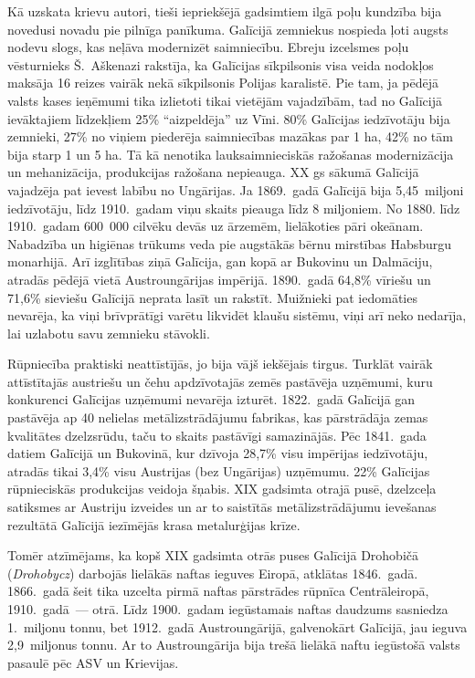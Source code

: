 \documentclass[twoside,a5paper,12pt,fleqn,openany]{extbook}
\newcommand{\pltxti}[1]{\textit{\textpolish{#1}}}
\begin{document}
Kā uzskata krievu autori, tieši iepriekšējā gadsimtiem ilgā poļu kundzība bija novedusi novadu pie pilnīga panīkuma. Galīcijā zemniekus nospieda ļoti augsts nodevu slogs, kas neļāva modernizēt saimniecību. Ebreju izcelsmes poļu vēsturnieks Š.~Aškenazi rakstīja, ka Galīcijas sīkpilsonis visa veida nodokļos maksāja 16 reizes vairāk nekā sīkpilsonis Polijas karalistē. Pie tam, ja pēdējā valsts kases ieņēmumi tika izlietoti tikai vietējām vajadzībām, tad no Galīcijā ievāktajiem līdzekļiem 25\% ``aizpeldēja'' uz Vīni. 80\% Galīcijas iedzīvotāju bija zemnieki, 27\% no viņiem piederēja saimniecības mazākas par 1 ha, 42\% no tām bija starp 1 un 5 ha. Tā kā nenotika lauksaimnieciskās ražošanas modernizācija un mehanizācija, produkcijas ražošana nepieauga. XX gs sākumā Galīcijā vajadzēja pat ievest labību no Ungārijas. Ja 1869.~gadā Galīcijā bija 5,45~miljoni iedzīvotāju, līdz 1910.~gadam viņu skaits pieauga līdz 8 miljoniem. No 1880. līdz 1910.~gadam 600~000 cilvēku devās uz ārzemēm, lielākoties pāri okeānam. Nabadzība un higiēnas trūkums veda pie augstākās bērnu mirstības Habsburgu monarhijā. Arī izglītības ziņā Galīcija, gan kopā ar Bukovinu un Dalmāciju, atradās pēdējā vietā Austroungārijas impērijā. 1890.~gadā 64,8\% vīriešu un 71,6\% sieviešu Galīcijā neprata lasīt un rakstīt. Muižnieki pat iedomāties nevarēja, ka viņi brīvprātīgi varētu likvidēt klaušu sistēmu, viņi arī neko nedarīja, lai uzlabotu savu zemnieku stāvokli.

Rūpniecība praktiski neattīstījās, jo bija vājš iekšējais tirgus. Turklāt vairāk attīstītajās austriešu un čehu apdzīvotajās zemēs pastāvēja uzņēmumi, kuru konkurenci Galīcijas uzņēmumi nevarēja izturēt. 1822.~gadā Galīcijā gan pastāvēja ap 40 nelielas metālizstrādājumu fabrikas, kas pārstrādāja zemas kvalitātes dzelzsrūdu, taču to skaits pastāvīgi samazinājās. Pēc 1841.~gada datiem Galīcijā un Bukovinā, kur dzīvoja 28,7\% visu impērijas iedzīvotāju, atradās tikai 3,4\% visu Austrijas (bez Ungārijas) uzņēmumu. 22\% Galīcijas rūpnieciskās produkcijas veidoja šņabis. XIX gadsimta otrajā pusē, dzelzceļa satiksmes ar Austriju izveides un ar to saistītās metālizstrādājumu ievešanas rezultātā Galīcijā iezīmējās krasa metalurģijas krīze.

Tomēr atzīmējams, ka kopš XIX gadsimta otrās puses Galīcijā Drohobičā (\pltxti{Drohobycz}) darbojās lielākās naftas ieguves Eiropā, atklātas 1846.~gadā. 1866.~gadā šeit tika uzcelta pirmā naftas pārstrādes rūpnīca Centrāleiropā, 1910.~gadā~--- otrā. Līdz 1900.~gadam iegūstamais naftas daudzums sasniedza 1.~miljonu tonnu, bet 1912.~gadā Austroungārijā, galvenokārt Galīcijā, jau ieguva 2,9~miljonus tonnu. Ar to Austroungārija bija trešā lielākā naftu iegūstošā valsts pasaulē pēc ASV un Krievijas.
\end{document}
